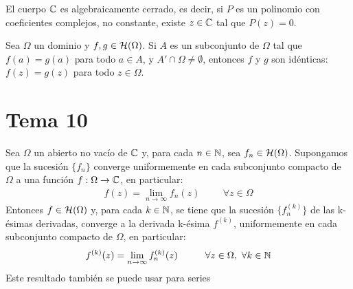 \documentclass[12pt]{article}
\begin{document}
    \begin{teo} El cuerpo $\mathbb{C}$ es algebraicamente cerrado, es decir, si $P$ es un polinomio con coeficientes complejos, no constante, existe $z\in \mathbb{C}$ tal que $P(z) = 0$.
    \end{teo}

    \begin{prop} Sea $\Omega$ un dominio y $f,g\in \mathcal{H}(\Omega)$. Si $A$ es un subconjunto de $\Omega$ tal que $f(a) = g(a)$ para todo $a\in A$, y $A' \cap \Omega \neq \emptyset$, entonces $f$ y $g$ son idénticas: $f(z)=g(z)$ para todo $z\in \Omega$.
    \end{prop}

    \section{Tema 10}

    \begin{teo} Sea $\Omega$ un abierto no vacío de $\mathbb{C}$ y, para cada $n\in \mathbb{N}$, sea $f_n \in \mathcal{H}(\Omega)$. Supongamos que la sucesión $\{f_n\}$ converge uniformemente en cada subconjunto compacto de $\Omega$ a una función $f:\Omega \to \mathbb{C}$, en particular:
    \begin{gather*}
        f(z) = \lim_{n\to \infty} f_n(z) \hspace{1cm} \forall z \in \Omega
    \end{gather*}
    Entonces $f\in \mathcal{H}(\Omega)$ y, para cada $k\in \mathbb{N}$, se tiene que la sucesión $\{f^{(k)}_n\}$ de las k-ésimas derivadas, converge a la derivada k-ésima $f^{(k)}$, uniformemente en cada subconjunto compacto de $\Omega$, en particular:
    \begin{gather*}
        f^{(k)} (z) = \lim_{n\to \infty} f_n^{(k)} (z) \hspace{1cm} \forall z \in \Omega,\ \forall k \in \mathbb{N}
    \end{gather*}
    Este resultado también se puede usar para series
    \end{teo}
\end{document}
